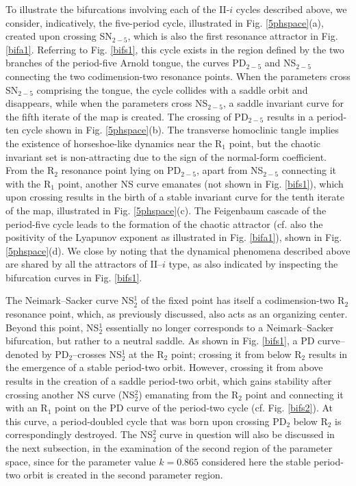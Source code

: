 \documentclass{article}
\theoremstyle{plain}
\theoremstyle{definition}
\begin{document}
To illustrate the bifurcations involving each of the II-$i$ cycles described above, we consider, indicatively, the five-period cycle, illustrated in Fig. \ref{5phspace}(a), created upon crossing SN$_{2-5}$, which is also the first resonance attractor in Fig. \ref{bifa1}. Referring to Fig. \ref{bifs1}, this cycle exists in the region defined by the two branches of the period-five Arnold tongue, the curves PD$_{2-5}$ and NS$_{2-5}$ connecting the two codimension-two resonance points. When the parameters cross SN$_{2-5}$ comprising the tongue, the cycle collides with a saddle orbit and disappears, while when the parameters cross NS$_{2-5}$, a saddle invariant curve for the fifth iterate of the map is created. The crossing of PD$_{2-5}$ results in a period-ten cycle shown in Fig. \ref{5phspace}(b). The transverse homoclinic tangle implies the existence of horseshoe-like dynamics near the R$_1$ point, but the chaotic invariant set is non-attracting due to the sign of the normal-form coefficient. From the R$_2$ resonance point lying on PD$_{2-5}$, apart from NS$_{2-5}$ connecting it with the R$_1$ point, another NS curve emanates (not shown in Fig. \ref{bifs1}), which upon crossing results in the birth of a stable invariant curve for the tenth iterate of the map, illustrated in Fig. \ref{5phspace}(c). The Feigenbaum cascade of the period-five cycle leads to the formation of the chaotic attractor (cf. also the positivity of the Lyapunov exponent as illustrated in Fig. \ref{bifa1}), shown in Fig. \ref{5phspace}(d). We close by noting that the dynamical phenomena described above are shared by all the attractors of II--$i$ type, as also indicated by inspecting the bifurcation curves in Fig. \ref{bifs1}. 

The Neimark--Sacker curve NS$_2^1$ of the fixed point has itself a codimension-two R$_2$ resonance point, which, as previously discussed, also acts as an organizing center. Beyond this point, NS$_2^1$ essentially no longer corresponds to a Neimark--Sacker bifurcation, but rather to a neutral saddle. As shown in Fig. \ref{bifs1}, a PD curve--denoted by PD$_{2}$--crosses NS$_2^1$ at the R$_2$ point; crossing it from below R$_2$ results in the emergence of a stable period-two orbit. However, crossing it from above results in the creation of a saddle period-two orbit, which gains stability after crossing another NS curve (NS$_2^2$) emanating from the R$_2$ point and connecting it with an R$_1$ point on the PD curve of the period-two cycle (cf. Fig. \ref{bifs2}). At this curve, a period-doubled cycle that was born upon crossing PD$_{2}$ below R$_2$ is correspondingly destroyed. The NS$_2^2$ curve in question will also be discussed in the next subsection, in the examination of the second region of the parameter space, since for the parameter value $k=0.865$ considered here the stable period-two orbit is created in the second parameter region.
\end{document}

